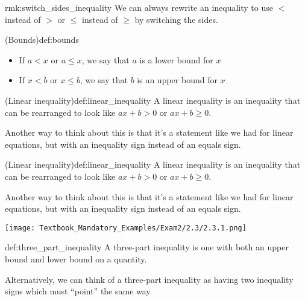 \documentclass{article}
\begin{document}
\begin{remark}{}{rmk:switch_sides_inequality}
    We can always rewrite an inequality to use $<$ instead of $>$ or $\leq$ instead of $\geq$ by switching the sides.
\end{remark}

\begin{definition}{(Bounds)}{def:bounds}
    \begin{itemize}
        \item If $a<x$ or $a\leq x$, we say that $a$ is a lower bound for $x$
        \item If $x<b$ or $x\leq b$, we say that $b$ is an upper bound for $x$
    \end{itemize}
\end{definition}

\begin{definition}{(Linear inequality)}{def:linear_inequality}
    A linear inequality is an inequality that can be rearranged to look like $ax+b>0$ or $ax+b\geq 0$.

    Another way to think about this is that it's a statement like we had for linear equations, but with an inequality sign instead of an equals sign.
\end{definition}

\begin{definition}{(Linear inequality)}{def:linear_inequality}
    A linear inequality is an inequality that can be rearranged to look like $ax+b>0$ or $ax+b\geq 0$.

    Another way to think about this is that it's a statement like we had for linear equations, but with an inequality sign instead of an equals sign.
\end{definition}

\texttt{[image: Textbook\_Mandatory\_Examples/Exam2/2.3/2.3.1.png]}

\begin{definition}{}{def:three_part_inequality}
    A three-part inequality is one with both an upper bound and lower bound on a quantity. 

    Alternatively, we can think of a three-part inequality as having two inequality signs which must ``point'' the same way.
\end{definition}
\end{document}
